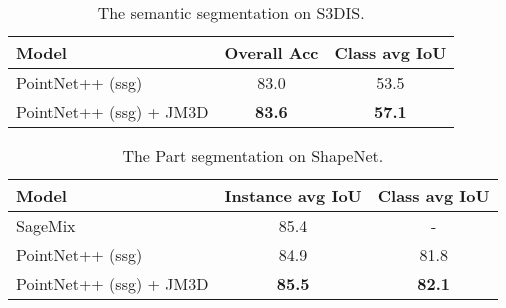 \documentclass[sigconf]{acmart}
\begin{document}

\balance



\clearpage


\appendix

\begin{table}[htb]
    \small
    \centering
        \caption{The semantic segmentation on S3DIS.}
    \begin{tabular}{lcc}
    \toprule
         Model& Overall Acc & Class avg IoU \\
         \midrule
PointNet++ (ssg) \cite{qi2017pointnet++} &  83.0 & 53.5 \\
         PointNet++ (ssg) \cite{qi2017pointnet++} + JM3D &  \textbf{83.6} & 
 \textbf{57.1}\\
\bottomrule
    \end{tabular}

    \label{tab:seg-semantic}
\end{table}

\begin{table}[htb]
    \small
    \centering
    \caption{The Part segmentation on ShapeNet.}
    \begin{tabular}{lcc}
    \toprule
         Model& Instance avg IoU & Class avg IoU \\
         \midrule
SageMix \cite{lee2022sagemix} &  85.4 & - \\
         PointNet++ (ssg) \cite{qi2017pointnet++} &  84.9 & 81.8 \\
         PointNet++ (ssg) \cite{qi2017pointnet++} + JM3D &  \textbf{85.5} & 
 \textbf{82.1}\\
\bottomrule
    \end{tabular}
    \label{tab:seg-part}
\end{table}
\end{document}
